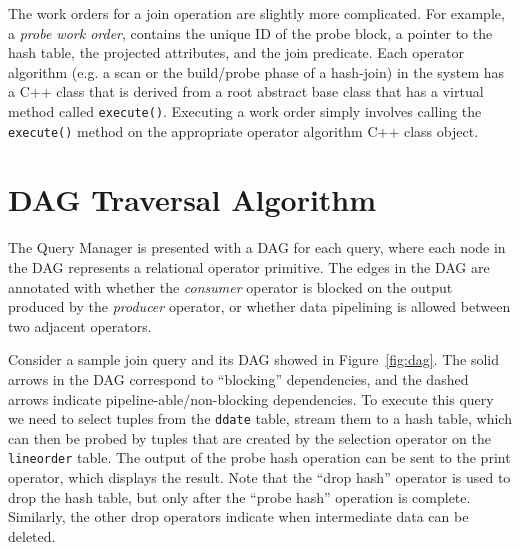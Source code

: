 The work orders for a join operation %
are slightly more complicated. 
For example, a \textit{probe work order},  contains the unique ID of the probe 
block, %
a pointer to the hash table, the projected attributes, and the join predicate.
Each operator algorithm (e.g. a scan or the build/probe phase of a hash-join) 
in the system has a C++ class that is derived from a root abstract base class that has a virtual method called \verb|execute()|.
Executing a work order simply involves calling the \verb|execute()| method 
on the appropriate operator algorithm C++ class object. 

\section{DAG Traversal Algorithm}\label{apx:DAG-algo}
The Query Manager is presented with a DAG for each query, where each
node in the DAG represents a relational operator primitive.
The edges in the DAG are annotated with whether the 
\textit{consumer} operator is blocked on the output produced 
by the \textit{producer} operator, or whether data pipelining is
allowed between two adjacent operators. 

Consider a sample join query and its DAG showed in Figure~\ref{fig:dag}.
The solid arrows in the DAG correspond to ``blocking'' dependencies,
and the dashed arrows indicate pipeline-able/non-blocking dependencies. 
To execute this query we need to select tuples from the \verb+ddate+ 
table, stream them to a hash table, which can then be probed by tuples that are 
created by the selection operator on the \verb+lineorder+ table. %
The output of the probe hash operation can be sent to the print operator, which
displays the result. %
Note that the ``drop hash'' operator is used to drop the hash table, but only 
after the ``probe hash'' operation is complete. 
Similarly, the other drop operators indicate when intermediate data can be deleted. 

